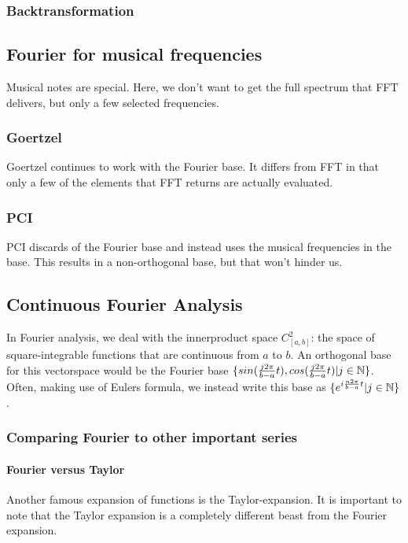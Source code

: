 \subsubsection{Backtransformation}

\subsection{Fourier for musical frequencies}
Musical notes are special. Here, we don't want to get the full spectrum that FFT delivers, but only a few selected frequencies. 
\subsubsection{Goertzel}
Goertzel continues to work with the Fourier base. It differs from FFT in that only a few of the elements that FFT returns are actually evaluated. 
\subsubsection{PCI}
PCI discards of the Fourier base and instead uses the musical frequencies in the base. This results in a non-orthogonal base, but that won't hinder us. 

\subsection{Continuous Fourier Analysis}

In Fourier analysis, we deal with the innerproduct space $C_{[a,b]}^2$: the space of square-integrable functions that are continuous from $a$ to $b$. An orthogonal base for this vectorspace would be the Fourier base $\{ sin(\frac{j 2 \pi}{b-a} t), cos(\frac{j 2 \pi}{b-a}  t) | j \in \mathbb{N} \}$. Often, making use of Eulers formula, we instead write this base as $\{ e^{i \frac{n 2 \pi}{b-a} t} | j \in \mathbb{N} \}$. 

\subsubsection{Comparing Fourier to other important series}

\paragraph{Fourier versus Taylor} Another famous expansion of functions is the Taylor-expansion. It is important to note that the Taylor expansion is a completely different beast from the Fourier expansion.

